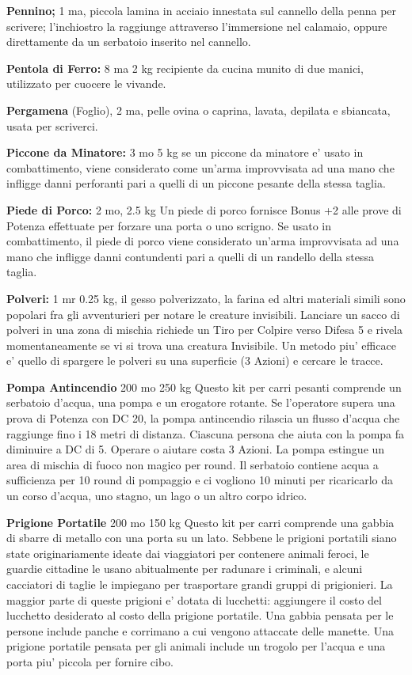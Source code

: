 \documentclass[a4paper,11pt,twoside,openany]{book}
\begin{document}
{\textbf{Pennino;} 1 ma, piccola lamina in acciaio innestata sul cannello della penna per scrivere; l'inchiostro la raggiunge attraverso l'immersione nel calamaio, oppure direttamente da un serbatoio inserito nel cannello.

\textbf{Pentola di Ferro:} 8 ma 2 kg recipiente da cucina munito di due manici, utilizzato per cuocere le vivande.

\textbf{Pergamena} (Foglio), 2 ma, pelle ovina o caprina, lavata, depilata e sbiancata, usata per scriverci.

\textbf{Piccone da Minatore:} 3 mo 5 kg se un piccone da minatore e' usato in combattimento, viene considerato come un'arma improvvisata ad una mano che infligge danni perforanti pari a quelli di un piccone pesante della stessa taglia.

\textbf{Piede di Porco:} 2 mo, 2.5 kg Un piede di porco fornisce Bonus +2 alle prove di Potenza effettuate per forzare una porta o uno scrigno. Se usato in combattimento, il piede di porco viene considerato un'arma improvvisata ad una mano che infligge danni contundenti pari a quelli di un randello della stessa taglia.

\textbf{Polveri:} 1 mr 0.25 kg, il gesso polverizzato, la farina ed altri materiali simili sono popolari fra gli avventurieri per notare le creature invisibili. Lanciare un sacco di polveri in una zona di mischia richiede un Tiro per Colpire verso Difesa 5 e rivela momentaneamente se vi si trova una creatura Invisibile. Un metodo piu' efficace e' quello di spargere le polveri su una superficie (3 Azioni) e cercare le tracce.

\textbf{Pompa Antincendio} 200 mo 250 kg Questo kit per carri pesanti comprende un serbatoio d'acqua, una pompa e un erogatore rotante. Se l'operatore supera una prova di Potenza con DC 20, la pompa antincendio rilascia un flusso d'acqua che raggiunge fino i 18 metri di distanza. Ciascuna persona che aiuta con la pompa fa diminuire a DC di 5. Operare o aiutare costa 3 Azioni. La pompa estingue un area di mischia di fuoco non magico per round. Il serbatoio contiene acqua a sufficienza per 10 round di pompaggio e ci vogliono 10 minuti per ricaricarlo da un corso d'acqua, uno stagno, un lago o un altro corpo idrico.

\textbf{Prigione Portatile} 200 mo 150 kg Questo kit per carri comprende una gabbia di sbarre di metallo con una porta su un lato. Sebbene le prigioni portatili siano state originariamente ideate dai viaggiatori per contenere animali feroci, le guardie cittadine le usano abitualmente per radunare i criminali, e alcuni cacciatori di taglie le impiegano per trasportare grandi gruppi di prigionieri. La maggior parte di queste prigioni e' dotata di lucchetti: aggiungere il costo del lucchetto desiderato al costo della prigione portatile. Una gabbia pensata per le persone include panche e corrimano a cui vengono attaccate delle manette. Una prigione portatile pensata per gli animali include un trogolo per l'acqua e una porta piu' piccola per fornire cibo.

}
\end{document}
